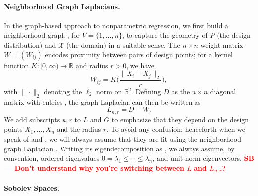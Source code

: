 \documentclass[twoside]{article}
\newcommand{\red}[1]{\textcolor{red}{#1}}
\newcommand{\sbcomment}[1]{{\bf{{\red{{SB --- #1}}}}}}
\newcommand{\Reals}{\mathbb{R}}
\newcommand{\1}{\mathbf{1}}
\newcommand{\Rd}{\Reals^d}
\newcommand{\Lap}{L}
\newcommand{\Xset}{\mathcal{X}}
\newcommand{\wh}[1]{\widehat{#1}}
\theoremstyle{definition}
\theoremstyle{remark}
\begin{document}
\paragraph{Neighborhood Graph Laplacians.}

In the graph-based approach to nonparametric regression, we first build a neighborhood graph , for $V=\{1,\ldots,n\}$, to capture the geometry of $P$ (the design distribution) and $\Xset$ (the domain) in a suitable sense. The $n \times n$ weight matrix $W = (W_{ij})$ encodes proximity between pairs of design points; for a kernel function $K: [0,\infty) \to \Reals$ and radius $r > 0$, we have
\begin{equation*}
\label{eqn:neighborhood_graph}
W_{ij} = K\Biggl(\frac{\|X_i - X_j\|_2}{r}\Biggr),
\end{equation*}
with $\|\cdot\|_2$ denoting the $\ell_2$ norm on $\Rd$. Defining $D$ as the $n \times n$ diagonal matrix with entries , the graph Laplacian can then be written as
\begin{equation}
\label{eqn:graph_Laplacian}
\Lap_{n,r} = D - W.
\end{equation}
We add subscripts $n,r$ to $\Lap$ and $G$ to emphasize that they depend on the design points $X_1,\ldots,X_n$ and the radius $r$. To avoid any confusion: henceforth when we speak of \smash{$\wh{f}$} and \smash{$\wh{T}$}, we will always assume that they are fit using the neighborhood graph Laplacian . Writing its eigendecomposition as , we always assume, by convention, ordered eigenvalues $0 = \lambda_1 \leq \cdots \leq \lambda_n$, and unit-norm eigenvectors. %
\sbcomment{Don't understand why you're switching between $L$ and $L_{n,r}$?}

\paragraph{Sobolev Spaces.}
\end{document}
